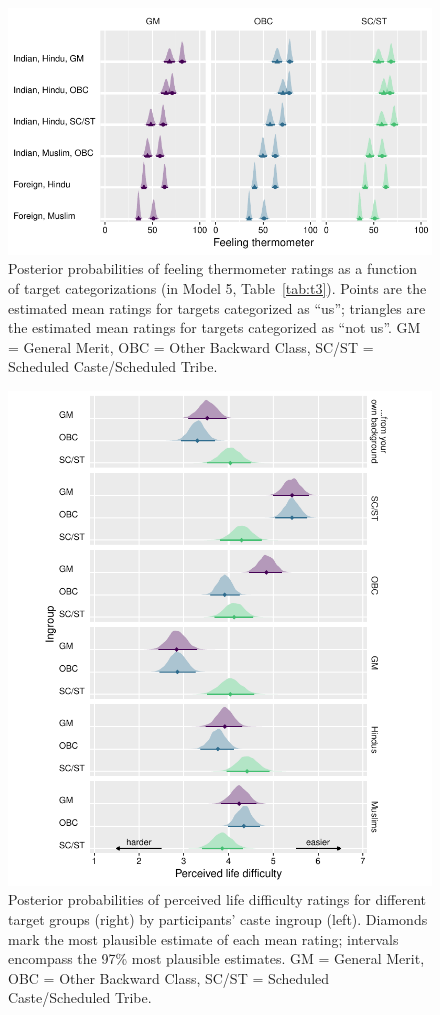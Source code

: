 \documentclass[12pt, a4paper]{article}
\begin{document}
\begin{figure}
\centering
\includegraphics[scale=1]{../figures/figure-6}
\caption{
Posterior probabilities of feeling thermometer ratings as a function of target categorizations (in Model 5, Table~\ref{tab:t3}). Points are the estimated mean ratings for targets categorized as ``us''; triangles are the estimated mean ratings for targets categorized as ``not us''. GM = General Merit, OBC = Other Backward Class, SC/ST = Scheduled Caste/Scheduled Tribe.
}
\label{fig:f6}
\end{figure}

\begin{figure}
\centering
\includegraphics[scale=1]{../figures/figure-7}
\caption{
Posterior probabilities of perceived life difficulty ratings for different target groups (right) by participants' caste ingroup (left). Diamonds mark the most plausible estimate of each mean rating; intervals encompass the 97\% most plausible estimates. GM = General Merit, OBC = Other Backward Class, SC/ST = Scheduled Caste/Scheduled Tribe.
}
\label{fig:f7}
\end{figure}
\end{document}
